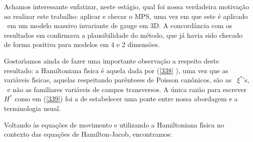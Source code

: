 \documentclass[a4paper,thmsa,12pt]{report}
\begin{document}
Achamos interessante enfatizar, neste est\'{a}gio, qual foi nossa verdadeira
motiva\c{c}\~{a}o ao realizar este trabalho: aplicar e checar o MPS, uma vez
em que este \'{e} aplicado \ em um modelo massivo invariante de gauge em 3D.
A concord\^{a}ncia com os resultados em \cite{devecchi} confirmava a
plausibilidade do m\'{e}todo, que j\'{a} havia sido checado de forma
positiva para modelos em 4 e 2 dimens\~{o}es.

Gostar\'{\i}amos ainda de fazer uma importante observa\c{c}\~{a}o a respeito
deste resultado: a Hamiltoniana f\'{\i}sica \'{e} aquela dada por (\ref{338}%
), uma vez que as vari\'{a}veis f\'{\i}sicas, aquelas respeitando
par\^{e}nteses de Poisson can\^{o}nicos, s\~{a}o as \ $\xi ^{\ast }$'s, \ e
n\~{a}o as familiares vari\'{a}veis de campos transversos. A \'{u}nica
raz\~{a}o para escrever $H^{\ast }$ como em (\ref{339}) foi a de estabelecer
uma ponte entre nossa abordagem e a terminologia usual.

Voltando \`{a}s equa\c{c}\~{o}es de movimento e utilizando a Hamiltoniana
f\'{\i}sica no contexto das equa\c{c}\~{o}es de Hamilton-Jacob, encontramos:
\end{document}
